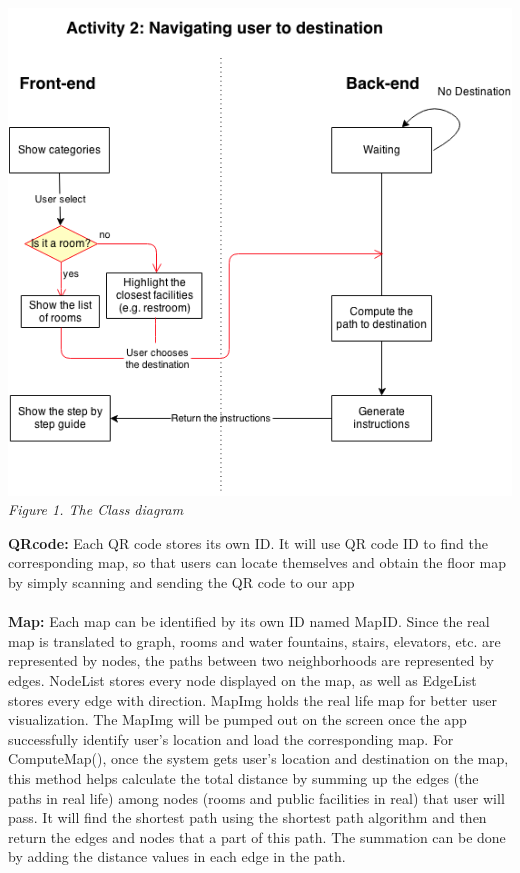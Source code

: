\documentclass[12pt]{article}
\begin{document}
\begin{center}
\includegraphics[scale=0.6]{image/image02.png}
\\
\textit{Figure 1. The Class diagram}
\end{center}

\textbf{QRcode:}	Each QR code stores its own ID. It will use QR code ID to find the corresponding map, so that users can locate themselves and obtain the floor map by simply scanning and sending the QR code to our app \\ \\
\textbf{Map: }
	Each map can be identified by its own ID named MapID. Since the real map is translated to graph, rooms and water fountains, stairs, elevators, etc. are represented by nodes, the paths between two neighborhoods are represented by edges. NodeList stores every node displayed on the map, as well as EdgeList stores every edge with direction.  MapImg holds the real life map for better user visualization.  The MapImg will be pumped out on the screen once the app successfully identify user’s location and load the corresponding map. 
 For ComputeMap(), once the system gets user’s location and destination on the map, this method helps calculate the total distance by summing up the edges (the paths in real life) among nodes (rooms and public facilities in real) that user will pass. It will find the shortest path using the shortest path algorithm and then return the edges and nodes that a part of this path. The summation can be done by adding the distance values in each edge in the path. \\ \\
\end{document}

